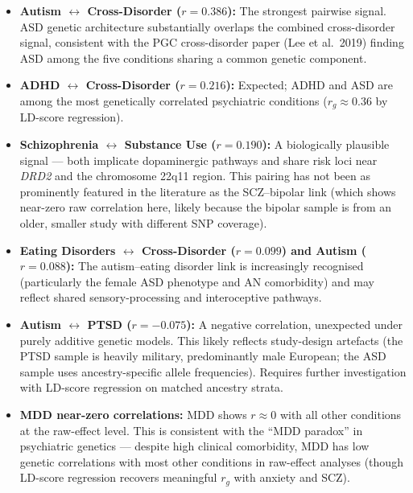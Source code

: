 \documentclass[11pt, a4paper]{article}
\begin{document}
\begin{itemize}
  \item \textbf{Autism $\leftrightarrow$ Cross-Disorder ($r = 0.386$):}
        The strongest pairwise signal. ASD genetic architecture substantially
        overlaps the combined cross-disorder signal, consistent with the PGC
        cross-disorder paper (Lee et al.\ 2019) finding ASD among the five conditions
        sharing a common genetic component.

  \item \textbf{ADHD $\leftrightarrow$ Cross-Disorder ($r = 0.216$):}
        Expected; ADHD and ASD are among the most genetically correlated psychiatric
        conditions ($r_g \approx 0.36$ by LD-score regression).

  \item \textbf{Schizophrenia $\leftrightarrow$ Substance Use ($r = 0.190$):}
        A biologically plausible signal — both implicate dopaminergic pathways and
        share risk loci near \textit{DRD2} and the chromosome 22q11 region.
        This pairing has not been as prominently featured in the literature as
        the SCZ--bipolar link (which shows near-zero raw correlation here, likely
        because the bipolar sample is from an older, smaller study with different
        SNP coverage).

  \item \textbf{Eating Disorders $\leftrightarrow$ Cross-Disorder ($r = 0.099$)
        and Autism ($r = 0.088$):}
        The autism--eating disorder link is increasingly recognised (particularly
        the female ASD phenotype and AN comorbidity) and may reflect shared
        sensory-processing and interoceptive pathways.

  \item \textbf{Autism $\leftrightarrow$ PTSD ($r = -0.075$):}
        A negative correlation, unexpected under purely additive genetic models.
        This likely reflects study-design artefacts (the PTSD sample is heavily
        military, predominantly male European; the ASD sample uses ancestry-specific
        allele frequencies). Requires further investigation with LD-score regression
        on matched ancestry strata.

  \item \textbf{MDD near-zero correlations:}
        MDD shows $r \approx 0$ with all other conditions at the raw-effect level.
        This is consistent with the ``MDD paradox'' in psychiatric genetics ---
        despite high clinical comorbidity, MDD has low genetic correlations with
        most other conditions in raw-effect analyses (though LD-score regression
        recovers meaningful $r_g$ with anxiety and SCZ).
\end{itemize}
\end{document}

